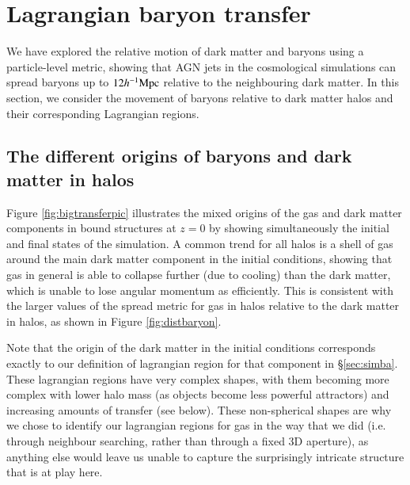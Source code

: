 \section{Lagrangian baryon transfer}
\label{sec:transfer}

We have explored the relative motion of dark matter and baryons using a particle-level metric, showing that AGN jets in the \simba{} cosmological simulations can spread baryons up to $12h^{-1}{\rm Mpc}{}$ relative to the neighbouring dark matter.
In this section, we consider the movement of baryons relative to dark matter halos 
and their corresponding Lagrangian regions. %

\subsection{The different origins of baryons and dark matter in halos}


Figure \ref{fig:bigtransferpic} illustrates the mixed origins of the gas and dark matter components in bound structures at $z=0$ by showing simultaneously the initial and final
states of the simulation. 
A common trend for all halos is a shell of gas around the main dark matter component
in the initial conditions, showing that gas in general is able to collapse
further (due to cooling) than the dark matter, which is unable to lose angular
momentum as efficiently. This is consistent with the larger values of the spread metric for gas in halos relative to the dark matter in halos, as shown in Figure \ref{fig:distbaryon}.

Note that the origin of the dark matter in the initial conditions corresponds
exactly to our definition of lagrangian region for that component in \S \ref{sec:simba}.
These lagrangian regions have very complex shapes, with them becoming more complex with
lower halo mass (as objects become less powerful attractors) and increasing amounts
of transfer (see below). These non-spherical shapes are why we chose to identify
our lagrangian regions for gas in the way that we did (i.e. through neighbour searching,
rather than through a fixed 3D aperture), as anything else would leave us unable to 
capture the surprisingly intricate structure that is at play here.


